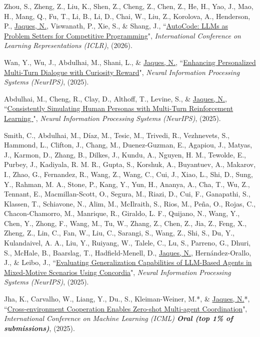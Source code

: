 \documentclass[paper=letter,fontsize=11pt]{scrartcl} %
\newcommand{\PaperEntry}[6]{
		\noindent #1, ``\href{#6}{#2}", \textit{#3}, #4 (#5).}
\begin{document}
\begin{etaremune}
\item \PaperEntry{Zhou, S., Zheng, Z., Liu, K., Shen, Z., Cheng, Z., Chen, Z., He, H., Yao, J., Mao, H., Mang, Q., Fu, T., Li, B., Li, D., Chai, W., Liu, Z., Korolova, A., Henderson, P., \underline{Jaques, N.}, Viswanath, P., Xie, S., \& Shang, J.}{AutoCode: LLMs as Problem Setters for Competitive Programming}{International Conference on Learning Representations (ICLR)}{}{2026}{https://arxiv.org/abs/2510.12803}

\item \PaperEntry{Wan, Y., Wu, J., Abdulhai, M., Shani, L., \& \underline{Jaques, N.}}{Enhancing Personalized Multi-Turn Dialogue with Curiosity Reward}{Neural Information Processing Systems (NeurIPS)}{}{2025}{https://arxiv.org/abs/2504.03206}

\item \PaperEntry{Abdulhai, M., Cheng, R., Clay, D., Althoff, T., Levine, S., \& \underline{Jaques, N.}}{Consistently Simulating Human Personas with Multi-Turn Reinforcement Learning
}{Neural Information Processing Systems (NeurIPS)}{}{2025}{https://arxiv.org/abs/2511.00222}

\item \PaperEntry{Smith, C., Abdulhai, M., Díaz, M., Tesic, M., Trivedi, R., Vezhnevets, S., Hammond, L., Clifton, J., Chang, M., Duenez-Guzman, E., Agapiou, J., Matyas, J., Karmon, D., Zhang, B., Dilkes, J., Kundu, A., Nguyen, H. M., Tewolde, E., Purbey, J., Kadiyala, R. M. R., Gupta, S., Korshuk, A., Buyantuev, A., Makarov, I., Zhao, G., Fernandez, R., Wang, Z., Wang, C., Cui, J., Xiao, L., Shi, D., Sung, Y., Rahman, M. A., Stone, P., Kang, Y., Yun, H., Ananya, A., Cha, T., Wu, Z., Tennant, E., Macmillan-Scott, O., Segura, M., Riazi, D., Cui, F., Ganapathi, S., Klassen, T., Schiavone, N., Alim, M., McIlraith, S., Rios, M., Peña, O., Rojas, C., Chacon-Chamorro, M., Manrique, R., Giraldo, L. F., Quijano, N., Wang, Y., Chen, Y., Zhong, F., Wang, M., Tu, W., Zhang, Z., Chen, Z., Jia, Z., Feng, X., Zheng, Z., Lin, C., Fan, W., Liu, C., Sarangi, S., Wang, Z., Shi, S., Du, Y., Kulandaivel, A. A., Liu, Y., Ruiyang, W., Talele, C., Lu, S., Parreno, G., Dhuri, S., McHale, B., Baarslag, T., Hadfield-Menell, D., \underline{Jaques, N.}, Hernández-Orallo, J., \& Leibo, J.}{Evaluating Generalization Capabilities of LLM-Based Agents in Mixed-Motive Scenarios Using Concordia}{Neural Information Processing Systems (NeurIPS)}{}{2025}{https://neurips.cc/virtual/2025/loc/san-diego/poster/121382}

\item \PaperEntry{Jha, K., Carvalho, W., Liang, Y., Du., S., Kleiman-Weiner, M.*, \& \underline{Jaques, N.}*}{Cross-environment Cooperation Enables Zero-shot Multi-agent Coordination}{International Conference on Machine Learning (ICML) \textbf{Oral (top 1\% of submissions)}}{}{2025}{https://arxiv.org/abs/2504.12714}


\end{etaremune}
\end{document}
